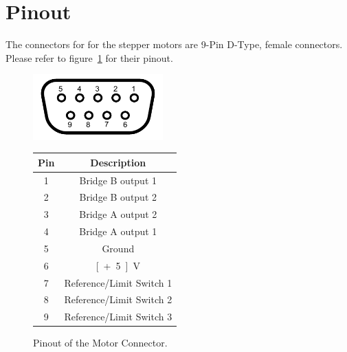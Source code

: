 \section{Pinout}
The connectors for for the stepper motors are 9-Pin D-Type, female connectors. Please refer to figure~\ref{pin_out} for their pinout.

\begin{figure}[h]
\begin{center}
\begin{minipage}[h]{5cm}
\includegraphics[width=5cm]{grafiken/Numbered_DE9_female_Diagram.pdf}
\end{minipage}
\hspace{1cm}
\begin{minipage}[h]{5cm}
\begin{tabular}{|c|c|}
\hline 
\textbf{Pin} & \textbf{Description} \\ \hline 
1 & Bridge B output 1 \\ \hline 
2 & Bridge B output 2 \\ \hline 
3 & Bridge A output 2 \\ \hline 
4 & Bridge A output 1 \\ \hline 
5 & Ground \\ \hline 
6 & \unit[+5]{V} \\ \hline 
7 & Reference/Limit Switch 1 \\ \hline 
8 & Reference/Limit Switch 2 \\ \hline 
9 & Reference/Limit Switch 3 \\ \hline 
\end{tabular}
\end{minipage}
\end{center}
\caption[Pinout of the Motor Connector.]{Pinout of the Motor Connector.}
\label{pin_out}
\end{figure}










\newpage
